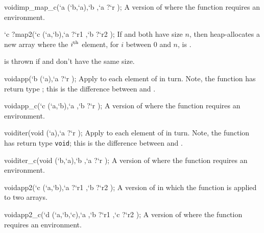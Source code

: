 \begin{defun2}{void}{imp_map_c}{(`a (`b,`a),`b ,`a {?}`r );}
  A version of  where the function  requires an
  environment.
\end{defun2}

\begin{defun2}{`c ?}{map2}{(`c (`a,`b),`a {?}`r1 ,`b {?}`r2 );}
  If  and  both have size $n$, then 
  heap-allocates a new array where the $i^{\rm th}$ element, for $i$
  between 0 and $n$, is .
    
   is thrown if  and  don't have
  the same size.
\end{defun2}

\begin{defun2}{void}{app}{(`b (`a),`a {?}`r );}
  Apply  to each element of  in turn.  Note, the
  function  has return type ; this is the difference
  between  and .
\end{defun2}

\begin{defun2}{void}{app_c}{(`c (`a,`b),`a ,`b {?}`r );}
  A version of  where the function requires an environment.
\end{defun2}

\begin{defun2}{void}{iter}{(void (`a),`a {?}`r );}
  Apply  to each element of  in turn.  Note, the
  function  has return type \texttt{void}; this is the
  difference between  and .
\end{defun2}

\begin{defun2}{void}{iter_c}{(void (`b,`a),`b ,`a {?}`r );}
  A version of  where the function requires an environment.
\end{defun2}


\begin{defun2}{void}{app2}{(`c (`a,`b),`a {?}`r1 ,`b {?}`r2 );}
  A version of  in which the function is applied to two arrays.
\end{defun2}


\begin{defun2}{void}{app2_c}{(`d (`a,`b,`c),`a ,`b {?}`r1 ,`c {?}`r2 );}
  A version of  where the function requires an environment.
\end{defun2}


